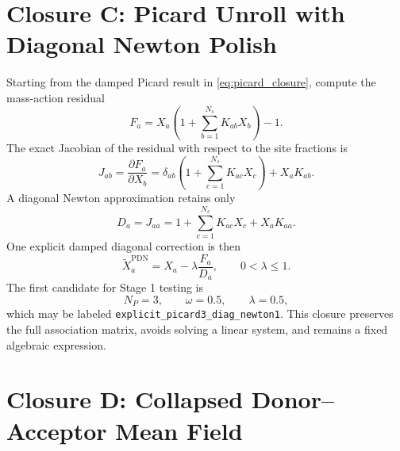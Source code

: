 \documentclass[12pt,letterpaper]{article}
\begin{document}
\section{Closure C: Picard Unroll with Diagonal Newton Polish}
\label{sec:closure-c}

Starting from the damped Picard result in \eqref{eq:picard_closure}, compute the
mass-action residual
\begin{equation}
  F_a =
  X_a\left(1+\sum_{b=1}^{N_s}K_{ab}X_b\right)-1.
  \label{eq:polish_residual}
\end{equation}
The exact Jacobian of the residual with respect to the site fractions is
\begin{equation}
  J_{ab}
  =
  \frac{\partial F_a}{\partial X_b}
  =
  \delta_{ab}\left(1+\sum_{c=1}^{N_s}K_{ac}X_c\right)
  +
  X_a K_{ab}.
  \label{eq:mass_action_jacobian}
\end{equation}
A diagonal Newton approximation retains only
\begin{equation}
  D_a =
  J_{aa}
  =
  1+\sum_{c=1}^{N_s}K_{ac}X_c+X_aK_{aa}.
  \label{eq:diagonal_newton_denominator}
\end{equation}
One explicit damped diagonal correction is then
\begin{equation}
  \widetilde{X}_a^{\mathrm{PDN}}
  =
  X_a - \lambda\frac{F_a}{D_a},
  \qquad 0<\lambda\le 1.
  \label{eq:diagonal_newton_update}
\end{equation}
The first candidate for Stage 1 testing is
\begin{equation}
  N_P=3,\qquad \omega=0.5,\qquad \lambda=0.5,
  \label{eq:picard_diag_newton_candidate}
\end{equation}
which may be labeled \texttt{explicit\_picard3\_diag\_newton1}. This
closure preserves the full association matrix, avoids solving a linear system,
and remains a fixed algebraic expression.

\section{Closure D: Collapsed Donor--Acceptor Mean Field}
\label{sec:closure-d}
\end{document}
